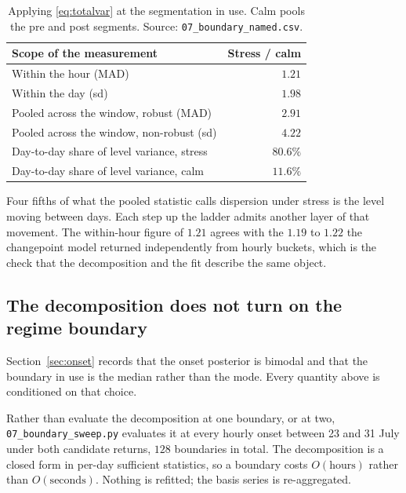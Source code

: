 \documentclass[11pt,a4paper]{article}
\newcommand{\code}[1]{\texttt{\small #1}}
\begin{document}
\begin{table}[htbp]
\centering
\small
\begin{tabular}{@{}lr@{}}
\toprule
Scope of the measurement & Stress / calm \\
\midrule
Within the hour (MAD)                          & $1.21$ \\
Within the day (sd)                            & $1.98$ \\
Pooled across the window, robust (MAD)         & $2.91$ \\
Pooled across the window, non-robust (sd)      & $4.22$ \\
\midrule
Day-to-day share of level variance, stress     & $80.6\%$ \\
Day-to-day share of level variance, calm       & $11.6\%$ \\
\bottomrule
\end{tabular}
\caption{Applying \eqref{eq:totalvar} at the segmentation in use. Calm pools the pre and
post segments. Source: \code{07\_boundary\_named.csv}.}
\end{table}

Four fifths of what the pooled statistic calls dispersion under stress is the level moving
between days. Each step up the ladder admits another layer of that movement. The within-hour
figure of $1.21$ agrees with the $1.19$ to $1.22$ the changepoint model returned
independently from hourly buckets, which is the check that the decomposition and the fit
describe the same object.

\subsection{The decomposition does not turn on the regime boundary}
\label{sec:sweep}

Section~\ref{sec:onset} records that the onset posterior is bimodal and that the boundary in
use is the median rather than the mode. Every quantity above is conditioned on that choice.

Rather than evaluate the decomposition at one boundary, or at two,
\code{07\_boundary\_sweep.py} evaluates it at every hourly onset between 23 and 31 July under
both candidate returns, $128$ boundaries in total. The decomposition is a closed form in
per-day sufficient statistics, so a boundary costs $O(\text{hours})$ rather than
$O(\text{seconds})$. Nothing is refitted; the basis series is re-aggregated.
\end{document}
